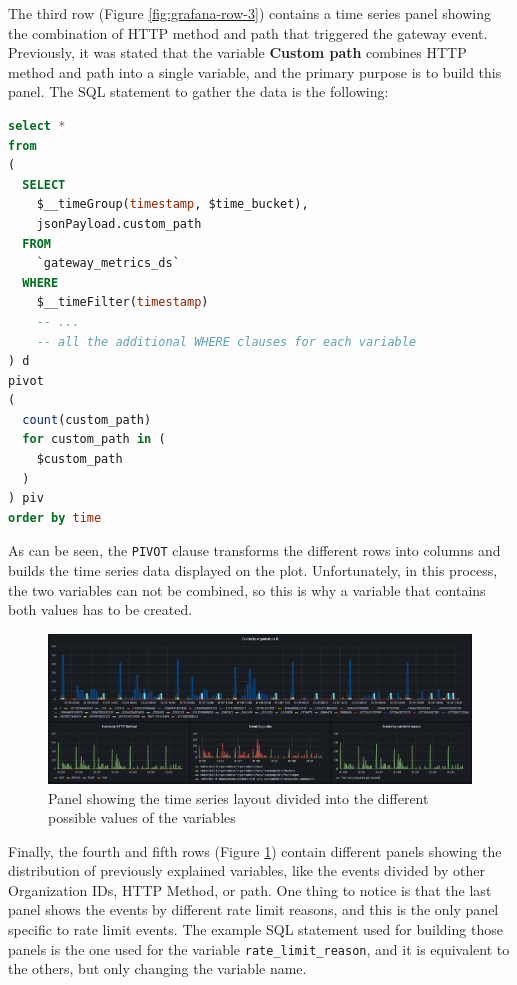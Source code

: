 \documentclass[english, 12pt, a4paper, sci, utf8, a-1b, online]{aaltothesis}
\begin{document}
The third row (Figure \ref{fig:grafana-row-3}) contains a time series panel showing the combination of HTTP method and path that triggered the gateway event. Previously, it was stated that the variable \textbf{Custom path} combines HTTP method and path into a single variable, and the primary purpose is to build this panel. The SQL statement to gather the data is the following:

\begin{lstlisting}[language=sql,firstnumber=1]
select *
from
(
  SELECT
    $__timeGroup(timestamp, $time_bucket),
    jsonPayload.custom_path
  FROM 
    `gateway_metrics_ds`
  WHERE 
    $__timeFilter(timestamp)
    -- ...
    -- all the additional WHERE clauses for each variable
) d
pivot
(
  count(custom_path)
  for custom_path in (
    $custom_path
  )
) piv
order by time
\end{lstlisting}

As can be seen, the \texttt{PIVOT} clause transforms the different rows into columns and builds the time series data displayed on the plot. Unfortunately, in this process, the two variables can not be combined, so this is why a variable that contains both values has to be created.\\

\begin{figure}[h]
    \centering
    \includegraphics[scale=0.24]{src/thesis/img/technical-solution/grafana-dashboard/row-4.png}
    \caption{Panel showing the time series layout divided into the different possible values of the variables}
    \label{fig:grafana-row-4}
\end{figure}

Finally, the fourth and fifth rows (Figure \ref{fig:grafana-row-4}) contain different panels showing the distribution of previously explained variables, like the events divided by other Organization IDs, HTTP Method, or path. One thing to notice is that the last panel shows the events by different rate limit reasons, and this is the only panel specific to rate limit events. The example SQL statement used for building those panels is the one used for the variable \texttt{rate\_limit\_reason}, and it is equivalent to the others, but only changing the variable name.\\
\end{document}
